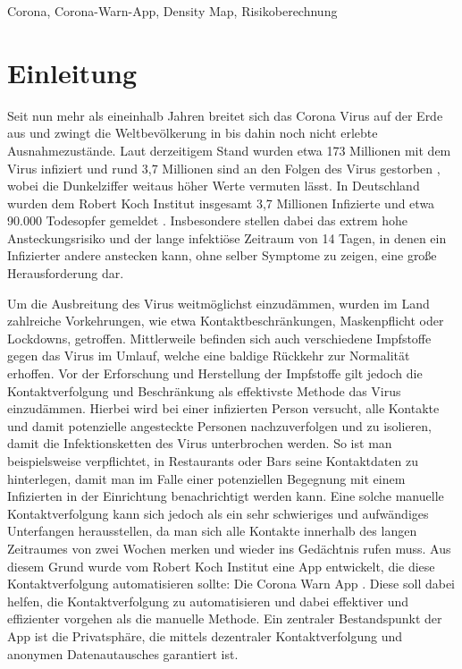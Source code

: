 \documentclass[conference,compsoc]{IEEEtran}
\begin{document}
\begin{IEEEkeywords}
Corona, Corona-Warn-App, Density Map, Risikoberechnung
\end{IEEEkeywords}

\section{Einleitung} \label{Einleitung}
Seit nun mehr als eineinhalb Jahren breitet sich das Corona Virus auf der Erde aus und zwingt die Weltbevölkerung in bis dahin noch nicht erlebte Ausnahmezustände.
Laut derzeitigem Stand wurden etwa 173 Millionen mit dem Virus infiziert und rund 3,7 Millionen sind an den Folgen des Virus gestorben \cite{CoronaZahlenWorld}, wobei die Dunkelziffer weitaus höher Werte vermuten lässt. 
In Deutschland wurden dem Robert Koch Institut insgesamt 3,7 Millionen Infizierte und etwa 90.000 Todesopfer gemeldet \cite{CoronaZahlenDe}. 
Insbesondere stellen dabei das extrem hohe Ansteckungsrisiko und der lange infektiöse Zeitraum von 14 Tagen, in denen ein Infizierter andere anstecken kann, ohne selber Symptome zu zeigen, eine große Herausforderung dar.

Um die Ausbreitung des Virus weitmöglichst einzudämmen, wurden im Land zahlreiche Vorkehrungen, wie etwa Kontaktbeschränkungen, Maskenpflicht oder Lockdowns, getroffen. 
Mittlerweile befinden sich auch verschiedene Impfstoffe gegen das Virus im Umlauf, welche eine baldige Rückkehr zur Normalität erhoffen.
Vor der Erforschung und Herstellung der Impfstoffe gilt jedoch die Kontaktverfolgung und Beschränkung als effektivste Methode das Virus einzudämmen. 
Hierbei wird bei einer infizierten Person versucht, alle Kontakte und damit potenzielle angesteckte Personen nachzuverfolgen und zu isolieren, damit die Infektionsketten des Virus unterbrochen werden.
So ist man beispielsweise verpflichtet, in Restaurants oder Bars seine Kontaktdaten zu hinterlegen, damit man im Falle einer potenziellen Begegnung mit einem Infizierten in der Einrichtung benachrichtigt werden kann.
Eine solche manuelle Kontaktverfolgung kann sich jedoch als ein sehr schwieriges und aufwändiges Unterfangen herausstellen, da man sich alle Kontakte innerhalb des langen Zeitraumes von zwei Wochen merken und wieder ins Gedächtnis rufen muss.
Aus diesem Grund wurde vom Robert Koch Institut eine App entwickelt, die diese Kontaktverfolgung automatisieren sollte: Die Corona Warn App \cite{CWA}. 
Diese soll dabei helfen, die Kontaktverfolgung zu automatisieren und dabei effektiver und effizienter vorgehen als die manuelle Methode.
Ein zentraler Bestandspunkt der App ist die Privatsphäre, die mittels dezentraler Kontaktverfolgung und anonymen Datenautausches garantiert ist.
\end{document}

